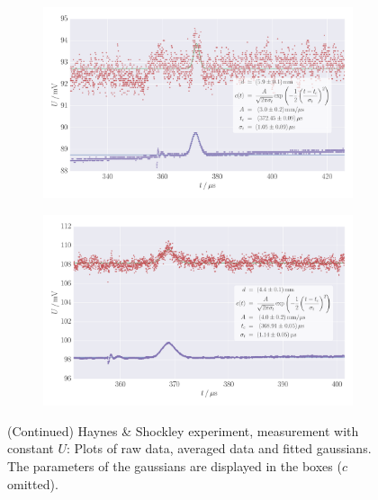 \begin{figure}
    \centering
    \begin{subfigure}[b]{\pltw}
        \includegraphics[width=1.0\linewidth]{figures/haynes_shockley_raw_22}
        \caption{}
        \label{fig:h_s_raw_22}
    \end{subfigure}
    \begin{subfigure}[b]{\pltw}
        \includegraphics[width=1.0\linewidth]{figures/haynes_shockley_raw_24}
        \caption{}
        \label{fig:h_s_raw_24}
    \end{subfigure}
    \caption{
        (Continued)
        Haynes \& Shockley experiment, measurement with constant $U$:
        Plots of raw data, averaged data and fitted gaussians. 
        The parameters of the gaussians are displayed in the boxes 
        ($c$ omitted).
        }
    \label{fig:h_s_raw_plots_22_24}
\end{figure}
